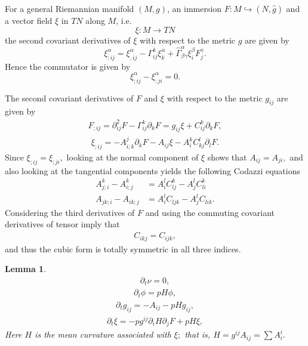 \documentclass{amsart}
\newtheorem{lemma}[theorem]{Lemma}
\theoremstyle{definition}
\theoremstyle{remark}
\numberwithin{equation}{section}
\begin{document}
For a general Riemannian manifold $(M,g)$, an immersion $F\colon M\hookrightarrow (N,\hat{g})$ and a vector field $\xi$ in $TN$ along $M$, i.e.
\[
\xi\colon M\rightarrow TN
\]
the second covariant derivatives of $\xi$ with respect to the metric $g$ are given by
\[
\xi^{ \alpha}_{;ij}=\xi^{ \alpha }_{,ij}-\Gamma_{ij}^k\xi^{ \alpha }_k+\hat{\Gamma}^{ \alpha }_{\beta\gamma}\xi^{\beta}_iF^{\gamma}_j.
\]
Hence the commutator is given by
\[
\xi_{;ij}^{ \alpha }-\xi_{;ji}^{ \alpha }=0.
\]


The second covariant derivatives of $F$ and $ \xi$ with respect to the metric $g_{ij}$ are given by
\begin{align}
F_{;ij}=\partial^2_{ij}F-\Gamma_{ij}^k\partial_kF=g_{ij}\xi+C_{ij}^k\partial_kF,
\end{align}
\begin{align}
\xi_{;ij}=-A_{i;k}^j\partial_kF-A_{ij}\xi-A_i^kC_{kj}^l\partial_lF.
\end{align}
Since $\xi_{;ij}=\xi_{;ji},$ looking at the normal component of $\xi$ shows that $A_{ij}=A_{ji},$ and also looking at the tangential components yields the following Codazzi equations
\begin{align}
A^k_{j;i}-A^k_{i;j}&=A_i^lC_{lj}^k-A^l_jC_{li}^k\\
A_{jk;i}-A_{ik;j}&=A_i^lC_{ljk}-A_j^lC_{lik}.
\end{align}
Considering the third derivatives of $F$ and using the  commuting covariant derivatives of tensor imply that
\begin{align}
C_{ikj}=C_{ijk},
\end{align}
and thus the cubic form is totally symmetric in all three indices. %
\begin{lemma}
\begin{align}
\partial_t\nu=0,
\end{align}
\begin{align}
\partial_t\phi= p  H\phi,
\end{align}
\begin{align}
\partial_tg_{ij}=-A_{ij}- p  Hg_{ij},
\end{align}
\begin{align}
\partial_t\xi=- p  g^{ij}\partial_iH\partial_jF+ p  H\xi,
\end{align}
Here $H$ is the mean curvature associated with $\xi;$ that is, $H=g^{ij}A_{ij}=\sum A_i^i.$
\end{lemma}
\end{document}

